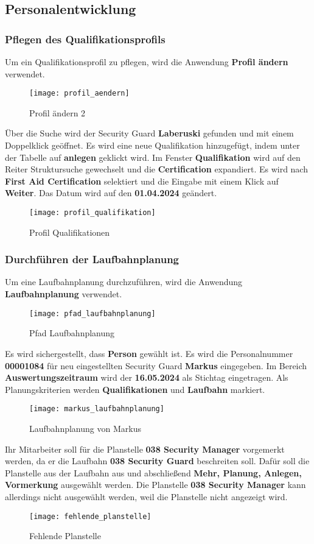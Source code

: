\subsection{Personalentwicklung}

\subsubsection{Pflegen des Qualifikationsprofils}
Um ein Qualifikationsprofil zu pflegen, wird die Anwendung \textbf{Profil ändern} verwendet.
\begin{figure}[H]
	\centering
	\texttt{[image: profil\_aendern]}
	\caption{Profil ändern 2}
	\label{fig:profil_aendern2}
\end{figure}
Über die Suche wird der Security Guard \textbf{Laberuski} gefunden und mit einem Doppelklick geöffnet. Es wird eine neue Qualifikation hinzugefügt, indem unter der Tabelle auf \textbf{anlegen} geklickt wird. Im Fenster \textbf{Qualifikation} wird auf den Reiter Struktursuche gewechselt und die \textbf{Certification} expandiert. Es wird nach \textbf{First Aid Certification} selektiert und die Eingabe mit einem Klick auf \textbf{Weiter}. Das Datum wird auf den \textbf{01.04.2024} geändert.
\begin{figure}[H]
	\centering
	\texttt{[image: profil\_qualifikation]}
	\caption{Profil Qualifikationen}
	\label{fig:profil_qualifikation}
\end{figure}

\subsubsection{Durchführen der Laufbahnplanung}
Um eine Laufbahnplanung durchzuführen, wird die Anwendung \textbf{Laufbahnplanung} verwendet.
\begin{figure}[H]
	\centering
	\texttt{[image: pfad\_laufbahnplanung]}
	\caption{Pfad Laufbahnplanung}
	\label{fig:pfad_laufbahnplanung}
\end{figure}
Es wird sichergestellt, dass \textbf{Person} gewählt ist. Es wird die Personalnummer \textbf{00001084} für neu eingestellten Security Guard \textbf{Markus} eingegeben. Im Bereich \textbf{Auswertungszeitraum} wird der \textbf{16.05.2024} als Stichtag eingetragen. Als Planungskriterien werden \textbf{Qualifikationen} und \textbf{Laufbahn} markiert.
\begin{figure}[H]
	\centering
	\texttt{[image: markus\_laufbahnplanung]}
	\caption{Laufbahnplanung von Markus}
	\label{fig:markus_laufbahnplanung}
\end{figure}
Ihr Mitarbeiter soll für die Planstelle \textbf{038 Security Manager} vorgemerkt werden, da er die Laufbahn \textbf{038 Security Guard} beschreiten soll. Dafür soll die Planstelle aus der Laufbahn aus und abschließend \textbf{Mehr, Planung, Anlegen, Vormerkung} ausgewählt werden. Die Planstelle \textbf{038 Security Manager} kann allerdings nicht ausgewählt werden, weil die Planstelle nicht angezeigt wird. 
\begin{figure}[H]
	\centering
	\texttt{[image: fehlende\_planstelle]}
	\caption{Fehlende Planstelle}
	\label{fig:fehlende_planstelle}
\end{figure}

